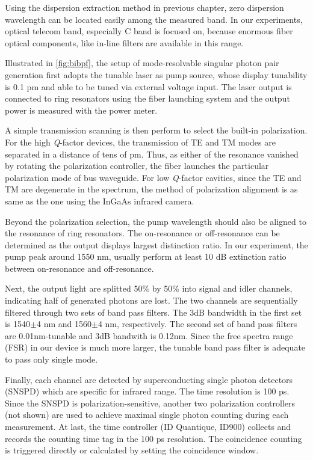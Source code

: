 Using the dispersion extraction method in previous chapter, zero dispersion wavelength can be located easily among the measured band. In our experiments, optical telecom band, especially C band is focused on, because enormous fiber optical components, like in-line filters are available in this range.

Illustrated in \autoref{fig:bibpf}, the setup of mode-resolvable singular photon pair generation first adopts the tunable laser as pump source, whose display tunability is 0.1 pm and able to be tuned via external voltage input. The laser output is connected to ring resonators using the fiber launching system and the output power is measured with the power meter. 

A simple transmission scanning is then perform to select the built-in polarization.
For the high \textit{Q}-factor devices, the transmission of TE and TM modes are separated in a distance of tens of pm. Thus, as either of the resonance vanished by rotating the polarization controller, the fiber launches the particular polarization mode of bus waveguide. For low \textit{Q}-factor cavities, since the TE and TM are degenerate in the spectrum, the method of polarization alignment is as same as the one using the InGaAs infrared camera.

Beyond the polarization selection, the pump wavelength should also be aligned to the resonance of ring resonators. The on-resonance or off-resonance can be determined as the output displays largest distinction ratio. In our experiment, the pump peak around 1550 nm, usually perform at least 10 dB extinction ratio between on-resonance and off-resonance.

Next, the output light are splitted 50\si{\percent} by 50\si{\percent} into signal and idler channels, indicating half of generated photons are lost. The two channels are sequentially filtered through two sets of band pass filters. The 3dB bandwidth in the first set is 1540$\pm$4 nm and 1560$\pm$4 nm, respectively. The second set of band pass filters are 0.01nm-tunable and 3dB bandwith is 0.12nm. Since the free spectra range (FSR) in our device is much more larger, the tunable band pass filter is adequate to pass only single mode.

Finally, each channel are detected by superconducting single photon detectors (SNSPD) which are specific for infrared range. The time resolution is 100 ps. Since the SNSPD is polarization-sensitive, another two polarization controllers (not shown) are used to achieve maximal single photon counting during each measurement. At last, the time controller (ID Quantique, ID900) collects and records the counting time tag in the 100 ps resolution. The coincidence counting is triggered directly or calculated by setting the coincidence window. 

